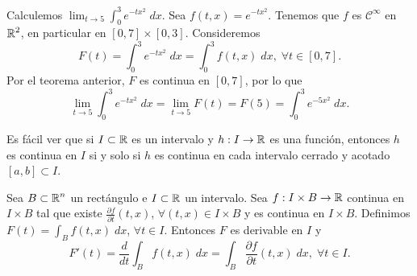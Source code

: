 \begin{eg}
	Calculemos $\displaystyle \lim_{t \to 5}\int^{3}_{0} e^{-tx^{2}} \; dx $. Sea $\displaystyle f\left(t,x\right)=e^{-tx^{2}} $. Tenemos que $\displaystyle f $ es $\displaystyle \mathcal{C}^{\infty} $ en $\displaystyle \mathbb{R}^{2} $, en particular en $\displaystyle \left[0,7\right] \times\left[0,3\right]  $. Consideremos
	\[F\left(t\right)=\int^{3}_{0} e^{-tx^{2}} \; dx = \int^{3}_{0} f\left(t,x\right) \; dx, \; \forall t \in \left[0,7\right]  .\]
	Por el teorema anterior, $\displaystyle F $ es continua en $\displaystyle \left[0,7\right]  $, por lo que 
	\[\lim_{t \to 5}\int^{3}_{0} e^{-tx^{2}} \; dx = \lim_{t \to 5}F\left(t\right)=F\left(5\right)=\int^{3}_{0} e^{-5x^{2}} \; dx .\]
\end{eg}
\begin{observation}
	Es fácil ver que si $\displaystyle I\subset \mathbb{R} $ es un intervalo y $\displaystyle h : I \to \mathbb{R} $ es una función, entonces $\displaystyle h $ es continua en $\displaystyle I $ si y solo si $\displaystyle h $ es continua en cada intervalo cerrado y acotado $\displaystyle \left[a,b\right] \subset I $. 
\end{observation}
\begin{theorem}
	Sea $\displaystyle B \subset \mathbb{R}^{n} $ un rectángulo e $\displaystyle I\subset \mathbb{R} $ un intervalo. Sea $\displaystyle f : I \times B \to \mathbb{R} $ continua en $\displaystyle I \times B $ tal que existe $\displaystyle \frac{\partial f}{\partial t}\left(t,x\right) $, $\displaystyle \forall \left(t,x\right)\in I \times B $ y es continua en $\displaystyle I \times B $. Definimos $\displaystyle F\left(t\right)=\int _{B}f\left(t,x\right) \; dx $, $\displaystyle \forall t \in I $. 
	Entonces $\displaystyle F $ es derivable en $\displaystyle I $ y
	\[F'\left(t\right)=\frac{d}{dt}\int _{B}f\left(t,x\right) \; dx=\int _{B}\frac{\partial f}{\partial t}\left(t,x\right) \; dx, \; \forall t \in I .\]
\end{theorem}

